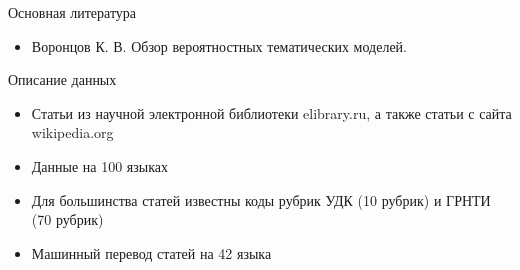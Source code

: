 \documentclass{beamer}
\begin{document}
\begin{frame}{Основная литература}

\begin{itemize}
    \item Воронцов К. В.
    Обзор вероятностных тематических моделей.
\end{itemize}

\end{frame}

\begin{frame}{Описание данных}

\begin{itemize}
    \item Статьи из научной электронной библиотеки elibrary.ru, а также статьи с сайта wikipedia.org
    \item Данные на 100 языках
    \item Для большинства статей известны коды рубрик УДК (10 рубрик) и ГРНТИ (70 рубрик)
    \item Машинный перевод статей на 42 языка
\end{itemize}


\end{frame}
\end{document}
